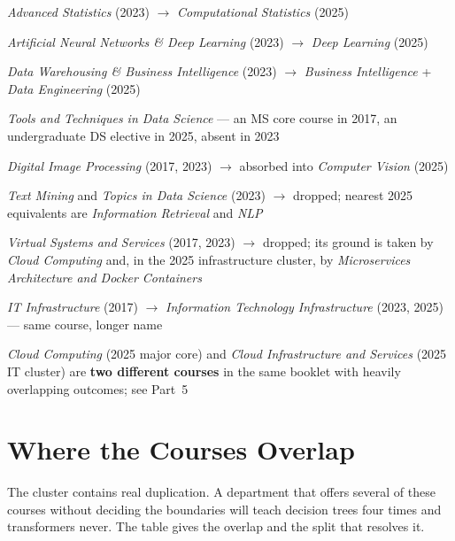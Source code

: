 \documentclass[11pt,a4paper,oneside]{report}
\begin{document}
\begin{notebox}
\begin{tight}
  \item \emph{Advanced Statistics} (2023) $\rightarrow$ \emph{Computational
        Statistics} (2025)
  \item \emph{Artificial Neural Networks \& Deep Learning} (2023) $\rightarrow$
        \emph{Deep Learning} (2025)
  \item \emph{Data Warehousing \& Business Intelligence} (2023) $\rightarrow$
        \emph{Business Intelligence} + \emph{Data Engineering} (2025)
  \item \emph{Tools and Techniques in Data Science} --- an MS core course in
        2017, an undergraduate DS elective in 2025, absent in 2023
  \item \emph{Digital Image Processing} (2017, 2023) $\rightarrow$ absorbed into
        \emph{Computer Vision} (2025)
  \item \emph{Text Mining} and \emph{Topics in Data Science} (2023) $\rightarrow$
        dropped; nearest 2025 equivalents are \emph{Information Retrieval} and
        \emph{NLP}
  \item \emph{Virtual Systems and Services} (2017, 2023) $\rightarrow$ dropped;
        its ground is taken by \emph{Cloud Computing} and, in the 2025
        infrastructure cluster, by \emph{Microservices Architecture and Docker
        Containers}
  \item \emph{IT Infrastructure} (2017) $\rightarrow$ \emph{Information
        Technology Infrastructure} (2023, 2025) --- same course, longer name
  \item \emph{Cloud Computing} (2025 major core) and \emph{Cloud Infrastructure
        and Services} (2025 IT cluster) are \textbf{two different courses} in the
        same booklet with heavily overlapping outcomes; see Part~5
\end{tight}
\end{notebox}

\section{Where the Courses Overlap}

The cluster contains real duplication. A department that offers several of these
courses without deciding the boundaries will teach decision trees four times and
transformers never. The table gives the overlap and the split that resolves it.
\end{document}
